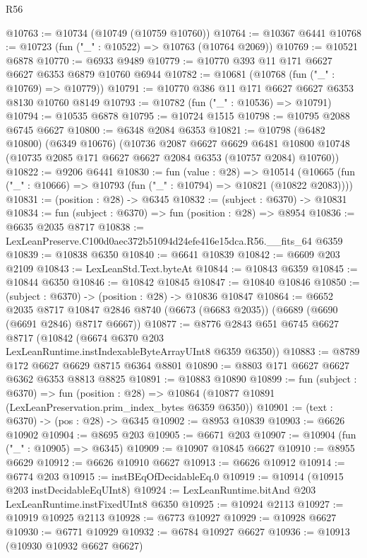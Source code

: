 \begin{lexlean}{R56}
\begin{coremodule}
@10763 := @10734 (@10749 (@10759 @10760))
@10764 := @10367 @6441
@10768 := @10723 (fun ("_" : @10522) => @10763 (@10764 @2069))
@10769 := @10521 @6878
@10770 := @6933 @9489
@10779 := @10770 @393 @11 @171 @6627 @6627 @6353 @6879 @10760 @6944
@10782 := @10681 (@10768 (fun ("_" : @10769) => @10779))
@10791 := @10770 @386 @11 @171 @6627 @6627 @6353 @8130 @10760 @8149
@10793 := @10782 (fun ("_" : @10536) => @10791)
@10794 := @10535 @6878
@10795 := @10724 @1515
@10798 := @10795 @2088 @6745 @6627
@10800 := @6348 @2084 @6353
@10821 := @10798
    (@6482 @10800)
    (@6349 @10676)
    (@10736
      @2087
      @6627
      @6629
      @6481
      @10800
      @10748
      (@10735 @2085 @171 @6627 @6627 @2084 @6353 (@10757 @2084) @10760))
@10822 := @9206 @6441
@10830 := fun (value : @28) =>
  @10514 (@10665 (fun ("_" : @10666) => @10793 (fun ("_" : @10794) => @10821 (@10822 @2083))))
@10831 := (position : @28) -> @6345
@10832 := (subject : @6370) -> @10831
@10834 := fun (subject : @6370) => fun (position : @28) => @8954
@10836 := @6635 @2035 @8717
@10838 := LexLeanPreserve.C100d0aec372b51094d24efe416e15dca.R56.__fits_64 @6359
@10839 := @10838 @6350
@10840 := @6641 @10839
@10842 := @6609 @203 @2109
@10843 := LexLeanStd.Text.byteAt
@10844 := @10843 @6359
@10845 := @10844 @6350
@10846 := @10842 @10845
@10847 := @10840 @10846
@10850 := (subject : @6370) -> (position : @28) -> @10836 @10847
@10864 := @6652
    @2035
    @8717
    @10847
    @2846
    @8740
    (@6673 (@6683 @2035))
    (@6689 (@6690 (@6691 @2846) @8717 @6667))
@10877 := @8776
    @2843
    @651
    @6745
    @6627
    @8717
    (@10842 (@6674 @6370 @203 LexLeanRuntime.instIndexableByteArrayUInt8 @6359 @6350))
@10883 := @8789 @172 @6627 @6629 @8715 @6364 @8801
@10890 := @8803 @171 @6627 @6627 @6362 @6353 @8813 @8825
@10891 := @10883 @10890
@10899 := fun (subject : @6370) =>
  fun (position : @28) => @10864 (@10877 @10891 (LexLeanPreservation.prim_index_bytes @6359 @6350))
@10901 := (text : @6370) -> (pos : @28) -> @6345
@10902 := @8953 @10839
@10903 := @6626 @10902
@10904 := @8695 @203
@10905 := @6671 @203
@10907 := @10904 (fun ("_" : @10905) => @6345)
@10909 := @10907 @10845 @6627
@10910 := @8955 @6629
@10912 := @6626 @10910 @6627
@10913 := @6626 @10912
@10914 := @6774 @203
@10915 := instBEqOfDecidableEq.{0}
@10919 := @10914 (@10915 @203 instDecidableEqUInt8)
@10924 := LexLeanRuntime.bitAnd @203 LexLeanRuntime.instFixedUInt8 @6350
@10925 := @10924 @2113
@10927 := @10919 @10925 @2113
@10928 := @6773 @10927
@10929 := @10928 @6627
@10930 := @6771 @10929
@10932 := @6784 @10927 @6627
@10936 := @10913 (@10930 @10932 @6627 @6627)

\end{coremodule}
\end{lexlean}
